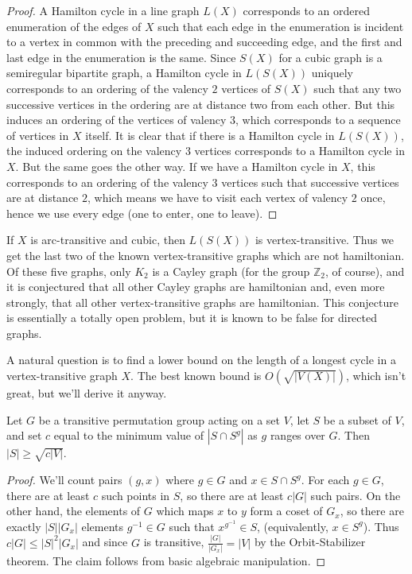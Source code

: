 \begin{proof}
	 
	
	A Hamilton cycle in a line graph $L(X)$ corresponds to an ordered enumeration of the edges of $X$ such that each edge in the enumeration is incident to a vertex in common with the preceding and succeeding edge, and the first and last edge in the enumeration is the same.  Since $S(X)$ for a cubic graph is a semiregular bipartite graph, a Hamilton cycle in $L(S(X))$ uniquely corresponds to an ordering of the valency $2$ vertices of $S(X)$ such that any two successive vertices in the ordering are at distance two from each other.  But this induces an ordering of the vertices of valency $3$, which corresponds to a sequence of vertices in $X$ itself.  It is clear that if there is a Hamilton cycle in $L(S(X))$, the induced ordering on the valency $3$ vertices corresponds to a Hamilton cycle in $X$.  But the same goes the other way.  If we have a Hamilton cycle in $X$, this corresponds to an ordering of the valency $3$ vertices such that successive vertices are at distance $2$, which means we have to visit each vertex of valency $2$ once, hence we use every edge (one to enter, one to leave).
\end{proof}


If $X$ is arc-transitive and cubic, then $L(S(X))$ is vertex-transitive.  Thus we get the last two of the known vertex-transitive graphs which are not hamiltonian.  Of these five graphs, only $K_2$ is a Cayley graph (for the group $\mathbb{Z}_2$, of course), and it is conjectured that all other Cayley graphs are hamiltonian and, even more strongly, that all other vertex-transitive graphs are hamiltonian.  This conjecture is essentially a totally open problem, but it is known to be false for directed graphs.

A natural question is to find a lower bound on the length of a longest cycle in a vertex-transitive graph $X$.  The best known bound is $O(\sqrt{|V(X)|})$, which isn't great, but we'll derive it anyway.  
\begin{lemma}
	Let $G$ be a transitive permutation group acting on a set $V$, let $S$ be a subset of $V$, and set $c$ equal to the minimum value of $|S\cap S^g|$ as $g$ ranges over $G$.  Then $|S|\geq \sqrt{c|V|}$.
		
		
\end{lemma}
\begin{proof}
	We'll count pairs $(g,x)$ where $g\in G$ and $x\in S\cap S^g$.  For each $g\in G$, there are at least $c$ such points in $S$, so there are at least $c|G|$ such pairs.  On the other hand, the elements of $G$ which maps $x$ to $y$ form a coset of $G_x$, so there are exactly $|S||G_x|$ elements $g^{-1}\in G$ such that $x^{g^{-1}}\in S$, (equivalently, $x\in S^g$).  Thus $c|G|\leq |S|^2|G_x|$ and since $G$ is transitive, $\frac{|G|}{|G_x|}=|V|$ by the Orbit-Stabilizer theorem.  The claim follows from basic algebraic manipulation.
\end{proof}




